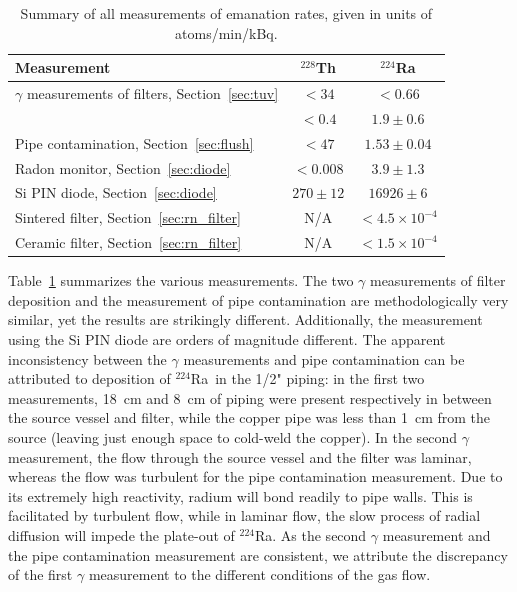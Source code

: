 \begin{table}[htb]
\centering
    \caption{Summary of all measurements of emanation rates, given in units of atoms/min/kBq.}
    \label{tab:rn_summary}
    \begin{tabular}{|lcc|}
        \hline \hline
        Measurement & $^{228}$Th & $^{224}$Ra \\ \hline
        $\gamma$ measurements of filters, Section~\ref{sec:tuv}  & $<34$ & $<0.66$ \\
        & $<0.4$ & $1.9\pm0.6$ \\
        Pipe contamination, Section~\ref{sec:flush} & $<47$ & $1.53\pm0.04$ \\
        Radon monitor, Section~\ref{sec:diode} & $<0.008$ & $3.9\pm1.3$ \\
        Si PIN diode, Section~\ref{sec:diode} & $270\pm12$ & $16926\pm6$ \\
        Sintered filter, Section~\ref{sec:rn_filter} & N/A & $<4.5\times10^{-4}$ \\
        Ceramic filter, Section~\ref{sec:rn_filter} & N/A & $<1.5\times10^{-4}$ \\
        \hline \hline
    \end{tabular}
\end{table}

Table~\ref{tab:rn_summary} summarizes the various measurements. The two $\gamma$ measurements of filter deposition and the measurement of pipe contamination are methodologically very similar, yet the results are strikingly different. Additionally, the measurement using the Si PIN diode are orders of magnitude different. The apparent inconsistency between the $\gamma$ measurements and pipe contamination can be attributed to deposition of $^{224}$Ra~in the 1/2" piping: in the first two measurements, 18~cm and 8~cm of piping were present respectively in between the source vessel and filter, while the copper pipe was less than 1~cm from the source (leaving just enough space to cold-weld the copper). In the second $\gamma$ measurement, the flow through the source vessel and the filter was laminar, whereas the flow was turbulent for the pipe contamination measurement. Due to its extremely high reactivity, radium will bond readily to pipe walls. This is facilitated by turbulent flow, while in laminar flow, the slow process of radial diffusion will impede the plate-out of $^{224}$Ra. As the second $\gamma$ measurement and the pipe contamination measurement are consistent, we attribute the discrepancy of the first $\gamma$ measurement to the different conditions of the gas flow.

